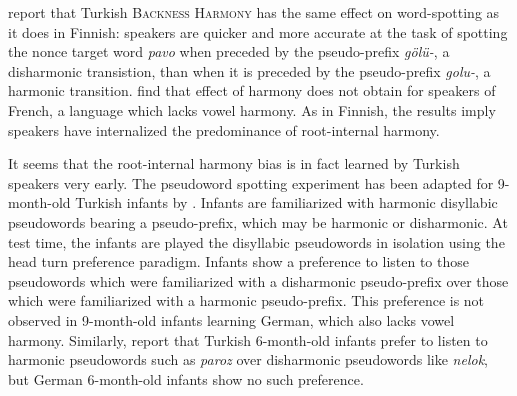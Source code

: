 \citet{Kabak2010} report that Turkish \textsc{Backness Harmony} has the same effect on word-spotting as it does in Finnish: speakers are quicker and more accurate at the task of spotting the nonce target word \emph{pavo} when preceded by the pseudo-prefix \emph{gölü-}, a disharmonic transistion, than when it is preceded by the pseudo-prefix \emph{golu-}, a harmonic transition. \citeauthor{Kabak2010} find that effect of harmony does not obtain for speakers of French, a language which lacks vowel harmony. As in Finnish, the results imply speakers have internalized the predominance of root-internal harmony.

It seems that the root-internal harmony bias is in fact learned by Turkish speakers very early. The pseudoword spotting experiment has been adapted for 9-month-old Turkish infants by \citet{Kampen2008}. Infants are familiarized with harmonic disyllabic pseudowords bearing a pseudo-prefix, which may be harmonic or disharmonic. At test time, the infants are played the disyllabic pseudowords in isolation using the head turn preference paradigm. Infants show a preference to listen to those pseudowords which were familiarized with a disharmonic pseudo-prefix over those which were familiarized with a harmonic pseudo-prefix. This preference is not observed in 9-month-old infants learning German, which also lacks vowel harmony. Similarly, \citeauthor{Kampen2008} report that Turkish 6-month-old infants prefer to listen to harmonic pseudowords such as \emph{paroz} over disharmonic pseudowords like \emph{nelok}, but German 6-month-old infants show no such preference.
